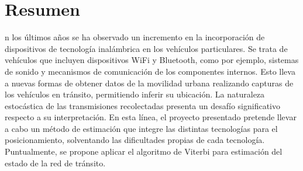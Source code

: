 %
%
%
\chapter*{Resumen}
\begin{SingleSpace}
n los últimos años se ha observado un incremento en la incorporación de dispositivos de tecnología inalámbrica en los vehículos particulares. Se trata de vehículos que incluyen dispositivos WiFi y Bluetooth, como por ejemplo, sistemas de sonido y mecanismos de comunicación de los componentes internos. Esto lleva a nuevas formas de obtener datos de la movilidad urbana realizando capturas de los vehículos en tránsito, permitiendo inferir su ubicación. La naturaleza estocástica de las transmisiones recolectadas presenta un desafío significativo respecto a su interpretación. 
En esta línea, el proyecto presentado pretende llevar a cabo un método de estimación que integre las distintas tecnologías para el posicionamiento, solventando las dificultades propias de cada tecnología. Puntualmente, se propone aplicar el algoritmo de Viterbi para estimación del estado de la red de tránsito.
\end{SingleSpace}
\clearpage

